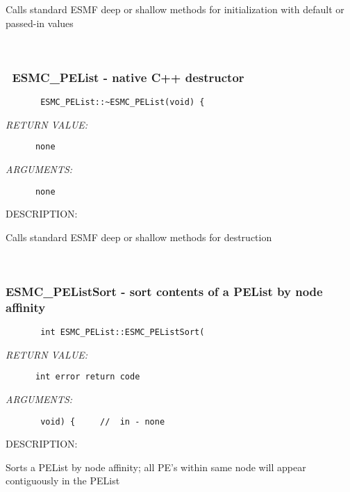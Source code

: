         Calls standard ESMF deep or shallow methods for initialization
        with default or passed-in values
   
 
\mbox{}\hrulefill\ 
 
\subsubsection{~ESMC\_PEList - native C++ destructor}


  
\begin{verbatim}       ESMC_PEList::~ESMC_PEList(void) {\end{verbatim}{\em RETURN VALUE:}
\begin{verbatim}      none\end{verbatim}{\em ARGUMENTS:}
\begin{verbatim}      none\end{verbatim}
{\sf DESCRIPTION:\\ }


        Calls standard ESMF deep or shallow methods for destruction
   
 
\mbox{}\hrulefill\ 
 
\subsubsection{ESMC\_PEListSort - sort contents of a PEList by node affinity}


  
\begin{verbatim}       int ESMC_PEList::ESMC_PEListSort(\end{verbatim}{\em RETURN VALUE:}
\begin{verbatim}      int error return code\end{verbatim}{\em ARGUMENTS:}
\begin{verbatim}       void) {     //  in - none\end{verbatim}
{\sf DESCRIPTION:\\ }


        Sorts a PEList by node affinity; all PE's within same node
        will appear contiguously in the PEList  
   
 
